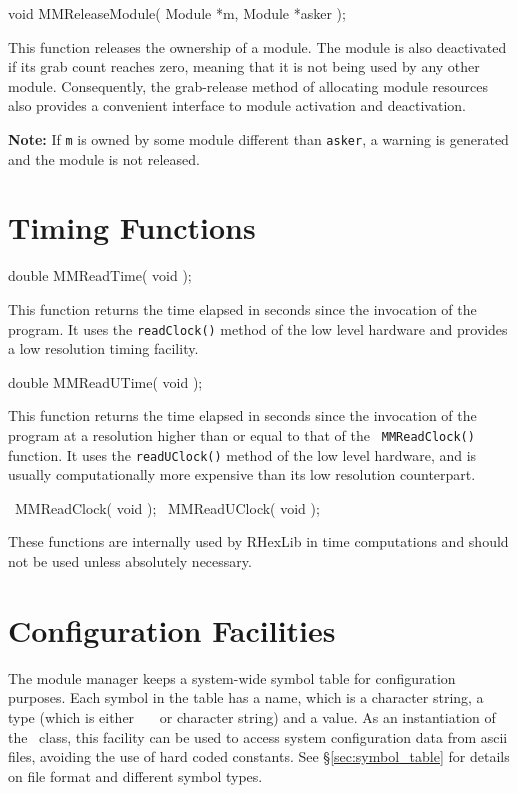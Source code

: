 \begin{prototype}
void MMReleaseModule( Module *m, Module *asker );
\end{prototype}

This function releases the ownership of a module. The module is also
deactivated if its grab count reaches zero, meaning that it is not being
used by any other module. Consequently, the grab-release method of
allocating module resources also provides a convenient interface to module
activation and deactivation.

{\bf Note:} If {\tt *m} is owned by some module different than {\tt *asker},
a warning is generated and the module is not released.

\section{Timing Functions}

\begin{prototype}
double MMReadTime( void );
\end{prototype}

This function returns the time elapsed in seconds since the invocation of the
program. It uses the {\tt readClock()} method of the low level hardware and
provides a low resolution timing facility.

\begin{prototype}
double MMReadUTime( void );
\end{prototype}

This function returns the time elapsed in seconds since the invocation of
the program at a resolution higher than or equal to that of the {\tt
MMReadClock()} function. It uses the {\tt readUClock()} method of the low
level hardware, and is usually computationally more expensive than its low
resolution counterpart.

\begin{prototype}
\CLOCK\ MMReadClock( void );
\CLOCK\ MMReadUClock( void );
\end{prototype}

These functions are internally used by RHexLib in time computations and
should not be used unless absolutely necessary.

\section{Configuration Facilities}

The \rhexlib module manager keeps a system-wide symbol table for
configuration purposes. Each symbol in the table has a name, which is a
character string, a type (which is either \float\, \floats\, \strings\, or
character string) and a value. As an instantiation of the \SymbolTable\
class, this facility can be used to access system configuration data from
ascii files, avoiding the use of hard coded constants. See
\S\ref{sec:symbol_table} for details on file format and different symbol
types.

